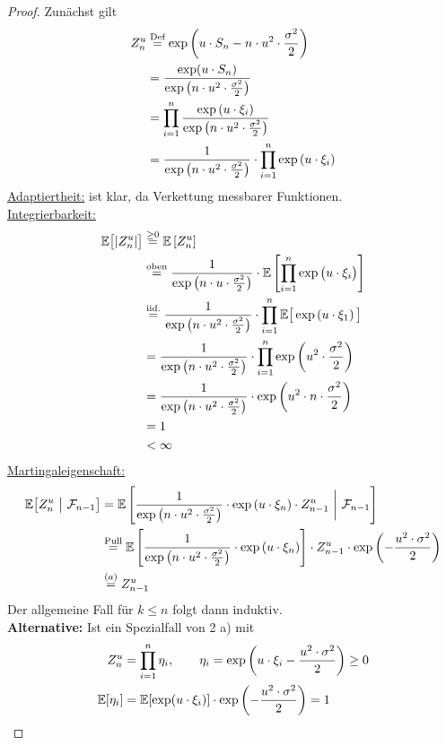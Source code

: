 \documentclass[12pt,a4paper]{article}
\begin{document}
\begin{proof} Zunächst gilt
\begin{align*}
Z_n^u
&\stackrel{\text{Def}}{=}\exp\left(u\cdot S_n-n\cdot u^2\cdot\frac{\sigma^2}{2}\right)\\
	&= \frac{\exp(u\cdot S_n)}{\exp\left(n\cdot u^2\cdot\frac{\sigma^2}{2}\right)} \\
	&=\prod_{i=1}^n \frac{\exp\left(u\cdot \xi_i\right)}{\exp\left(n\cdot u^2\cdot \frac{\sigma^2}{2}\right)} \\
	&=\frac{1}{\exp\left(n\cdot u^2\cdot \frac{\sigma^2}{2}\right)}\cdot\prod_{i=1}^n \exp\left(u\cdot\xi_i\right)
\end{align*}
\underline{Adaptiertheit:} ist klar, da Verkettung messbarer Funktionen.\\

\underline{Integrierbarkeit:}
\begin{align*}
\mathbb{E}\big[|Z_n^u|\big]
	&\stackrel{\geq0}{=}\mathbb{E}\left[Z^u_n\right]\\ 
	&\stackrel{\text{oben}}{=}
	\frac{1}{\exp\left(n\cdot u\cdot\frac{\sigma^2}{2}\right)}\cdot\mathbb{E}\left[\prod\limits_{i=1}^n \exp\big(u\cdot\xi_i\big)\right]\\
	&\stackrel{\text{iid.}}{=}\frac{1}{\exp\left(n\cdot u^2\cdot\frac{\sigma^2}{2}\right)}\cdot\prod_{i=1}^n \mathbb{E}\big[\exp\left(u\cdot\xi_1\right)\big] \\
	&=\frac{1}{\exp\left(n\cdot u^2\cdot\frac{\sigma^2}{2}\right)}\cdot\prod_{i=1}^n \exp\left(u^2\cdot\frac{\sigma^2}{2}\right) \\
	&=\frac{1}{\exp\left(n\cdot u^2\cdot\frac{\sigma^2}{2}\right)}\cdot \exp\left(u^2\cdot n\cdot\frac{\sigma^2}{2}\right) \\
	&=1 \\
	&<\infty
\end{align*}
\underline{Martingaleigenschaft:}
\begin{align*}
	\mathbb{E}\big[Z_n^u ~\big|~\mathcal{F}_{n-1}\big]
	&=\mathbb{E}\left[\frac{1}{\exp\left(n\cdot u^2\cdot\frac{\sigma^2}{2}\right)}\cdot\exp\left(u\cdot\xi_n\right)\cdot Z^u_{n-1}~\bigg|~\mathcal{F}_{n-1}\right]\\
	&\stackrel{\text{Pull}}{=}
	\mathbb{E}\left[\frac{1}{\exp\left(n\cdot u^2\cdot\frac{\sigma^2}{2}\right)}\cdot\exp\left(u\cdot\xi_n\right)\right]\cdot Z^u_{n-1}\cdot\exp\left(-\frac{u^2\cdot\sigma^2}{2}\right)\\
	&\stackrel{(a)}{=} Z^u_{n-1}
\end{align*}
Der allgemeine Fall für $k\leq n$ folgt dann induktiv.\\

\textbf{Alternative:} Ist ein Spezialfall von 2 a) mit
\begin{align*}
Z_n^u&=\prod\limits_{i=1}^n\eta_i,\qquad\eta_i=\exp\left(u\cdot\xi_i-\frac{u^2\cdot\sigma^2}{2}\right)\geq0\\
\mathbb{E}[\eta_i]&=\mathbb{E}[\exp(u\cdot\xi_i)]\cdot\exp\left(-\frac{u^2\cdot\sigma^2}{2}\right)=1
\end{align*}
\end{proof}
\end{document}
